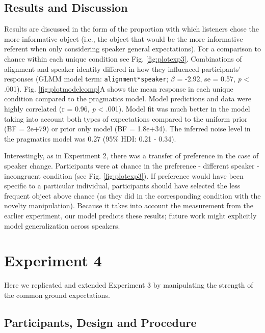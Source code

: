 \documentclass[10pt, letterpaper]{article}
\begin{document}
\subsection{Results and Discussion}\label{results-and-discussion-2}

Results are discussed in the form of the proportion with which listeners
chose the more informative object (i.e., the object that would be the
more informative referent when only considering speaker general
expectations). For a comparison to chance within each unique condition
see Fig. \ref{fig:plotexp3}. Combinations of alignment and speaker
identity differed in how they influenced participants' responses (GLMM
model term: \texttt{alignment*speaker}; \(\beta\) = -2.92, se = 0.57,
\emph{p} \textless{} .001). Fig. \ref{fig:plotmodelcomp}A shows the mean
response in each unique condition compared to the pragmatics model.
Model predictions and data were highly correlated (r = 0.96, \emph{p}
\textless{} .001). Model fit was much better in the model taking into
account both types of expectations compared to the uniform prior (BF =
2e+79) or prior only model (BF = 1.8e+34). The inferred noise level in
the pragmatics model was 0.27 (95\% HDI: 0.21 - 0.34).

Interestingly, as in Experiment 2, there was a transfer of preference in
the case of speaker change. Participants were at chance in the
preference - different speaker - incongruent condition (see Fig.
\ref{fig:plotexp3}). If preference would have been specific to a
particular individual, participants should have selected the less
frequent object above chance (as they did in the corresponding condition
with the novelty manipulation). Because it takes into account the
measurement from the earlier experiment, our model predicts these
results; future work might explicitly model generalization across
speakers.

\section{Experiment 4}\label{experiment-4}

Here we replicated and extended Experiment 3 by manipulating the
strength of the common ground expectations.

\subsection{Participants, Design and
Procedure}\label{participants-design-and-procedure-3}
\end{document}
